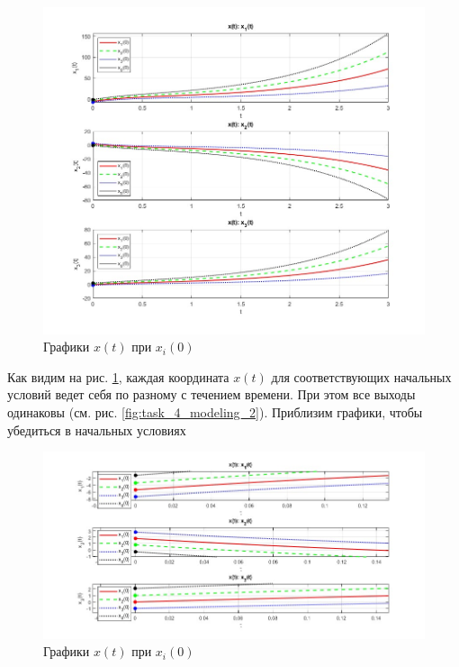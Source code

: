 \documentclass[a4paper, 12pt]{article}
\begin{document}
    \begin{figure}[H]
        \centering
        \includegraphics[scale=0.5]{task_4_x_t_x_i.jpg}
        \captionsetup{skip=0pt}
        \caption{Графики $x(t)$ при $x_i(0)$}
        \label{fig:task_4_modeling_3}
    \end{figure}
    \noindent Как видим на рис. \ref{fig:task_4_modeling_3}, каждая координата $x(t)$ для соответствующих начальных условий
    ведет себя по разному с течением времени. При этом все выходы одинаковы (см. рис. \ref{fig:task_4_modeling_2}).
    Приблизим графики, чтобы убедиться в начальных условиях
    \begin{figure}[H]
        \centering
        \includegraphics[scale=0.52]{task_4_x_t_x_i_close.jpg}
        \captionsetup{skip=0pt}
        \caption{Графики $x(t)$ при $x_i(0)$}
        \label{fig:task_4_modeling_4}
    \end{figure}
\end{document}
